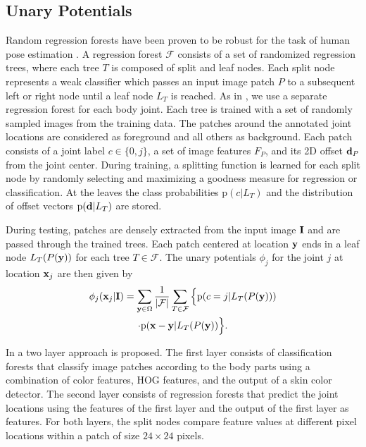 \documentclass[a4paper, 10pt, conference]{ieeeconf}      \usepackage{FG2017}
\begin{document}
\subsection{Unary Potentials}
\label{sec:unary_potentials}


Random regression forests have been proven to be robust for the task of human pose estimation \cite{shotton2011real, minsun_cvpr2012, dantone_tpami2014}. A regression forest $\mathcal{F}$ consists of a set of randomized regression trees, where each tree $T$ is composed of split and leaf nodes. Each split node represents a weak classifier which passes an input image patch $P$ to a subsequent left or right node until a leaf node $L_T$ is reached. As in \cite{dantone_tpami2014}, we use a separate regression forest for each body joint. Each tree is trained with a set of randomly sampled images from the training data. The patches around the annotated joint locations are considered as foreground and all others as background. Each patch consists of a joint label $c \in \{0,j\}$, a set of image features $F_P$, and its 2D offset $\bold{d}_P$ from the joint center. 
During training, a splitting function is learned for each split node by randomly selecting and maximizing a goodness measure for regression or classification.  
At the leaves the class probabilities $\mathrm{p}(c|L_T)$ and the distribution of offset vectors $\mathrm{p}(\bold{d}|L_T)$ are stored.          

During testing, patches are densely extracted from the input image $\bold{I}$ and are passed through the trained trees. 
Each patch centered at location $\bold{y}$ ends in a leaf node $L_T (P(\bold{y}))$ for each tree $T \in \mathcal{F}$.
The unary potentials $\phi_j$ for the joint $j$ at location $\bold{x}_j$ are then given by 
\begin{multline} 
\label{eqt:unary_potentials}
\phi_j(\bold{x}_j|\bold{I}) = \sum_{\bold{y} \in \Omega}\dfrac{1}{|\mathcal{F}|} \sum_{T \in \mathcal{F}} \Big\{ \mathrm {p}(c=j|L_T (P(\bold{y}))) \\ \cdot \mathrm{p}(\bold{x}-\bold{y}|L_T (P(\bold{y}))\Big\}.
\end{multline}

In \cite{dantone_tpami2014} a two layer approach is proposed. The first layer consists of classification forests that classify image patches according to the body parts using a combination of color features, HOG features, and the output of a skin color detector. The second layer consists of regression forests that predict the joint locations using the features of the first layer and the output of the first layer as features. For both layers, the split nodes compare feature values at different pixel locations within a patch of size $24\times24$ pixels.   
\end{document}
